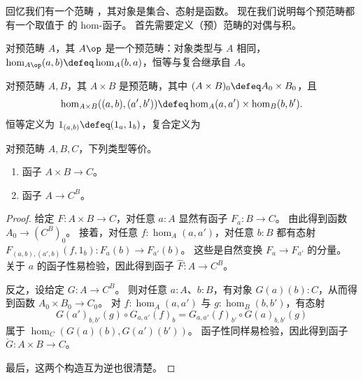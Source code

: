 回忆我们有一个范畴 \uset，其对象是集合、态射是函数。
现在我们说明每个预范畴都有一个取值于 \uset 的 hom-函子。
首先需要定义（预）范畴的对偶与积。

\begin{defn}\label{ct:opposite-category}
  对预范畴 $A$，其
  $A\op$ 是一个预范畴：对象类型与 $A$ 相同，$\hom_{A\op}(a,b) \defeq \hom_A(b,a)$，恒等与复合继承自 $A$。
\end{defn}

\begin{defn}\label{ct:prod-cat}
  对预范畴 $A,B$，其
  $A\times B$ 是预范畴，其中 $(A\times B)_0 \defeq A_0 \times B_0$，且
  \[\hom_{A\times B}((a,b),(a',b')) \defeq \hom_A(a,a') \times \hom_B(b,b').\]
  恒等定义为 $1_{(a,b)}\defeq (1_a,1_b)$，复合定义为
\end{defn}

\begin{lem}\label{ct:functorexpadj}
  对预范畴 $A,B,C$，下列类型等价。
  \begin{enumerate}
  \item 函子 $A\times B\to C$。
  \item 函子 $A\to C^B$。
  \end{enumerate}
\end{lem}
\begin{proof}
  给定 $F:A\times B\to C$，对任意 $a:A$ 显然有函子 $F_a : B\to C$。
  由此得到函数 $A_0 \to (C^B)_0$。
  接着，对任意 $f:\hom_A(a,a')$，对任意 $b:B$ 都有态射
  $F_{(a,b),(a',b)}(f,1_b):F_a(b) \to F_{a'}(b)$。
  这些是自然变换 $F_a \to F_{a'}$ 的分量。
  关于 $a$ 的函子性易检验，因此得到函子 $\hat{F}:A\to C^B$。

  反之，设给定 $G:A\to C^B$。
  则对任意 $a:A$、$b:B$，有对象 $G(a)(b):C$，从而得到函数 $A_0 \times B_0 \to C_0$。
  对 $f:\hom_A(a,a')$ 与 $g:\hom_B(b,b')$，有态射
  \begin{equation*}
     G(a')_{b,b'}(g)\circ G_{a,a'}(f)_b = G_{a,a'}(f)_{b'} \circ  G(a)_{b,b'}(g)
  \end{equation*}
  属于 $\hom_C(G(a)(b), G(a')(b'))$。
  函子性同样易检验，因此得到函子 $\check{G}:A\times B \to C$。

  最后，这两个构造互为逆也很清楚。
\end{proof}

